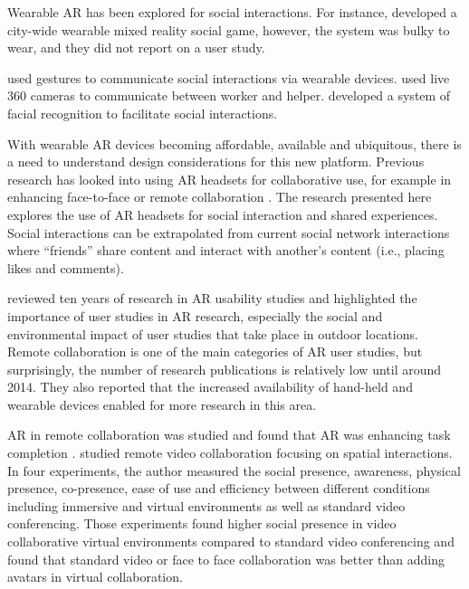 Wearable AR has been explored for social interactions. For instance, \textcite{Cheok2002a} developed a city-wide wearable mixed reality social game, however, the system was bulky to wear, and they did not report on a user study. 

\textcite{Amores2015} used gestures to communicate social interactions via wearable devices. \textcite{Lee2019} used live 360 cameras to communicate between worker and helper. \textcite{Shu2018} developed a system of facial recognition to facilitate social interactions. 

With wearable AR devices becoming affordable, available and ubiquitous, there is a need to understand design considerations for this new platform. Previous research has looked into using AR headsets for collaborative use, for example in enhancing face-to-face \cite{Billinghurst2002} or remote collaboration \cite{Gupta2016}. The research presented here explores the use of AR headsets for social interaction and shared experiences. Social interactions can be extrapolated from current social network interactions where \enquote{friends} share content and interact with another's content (i.e., placing likes and comments).

\textcite{Dey2018} reviewed ten years of research in AR usability studies and highlighted the importance of user studies in AR research, especially the social and environmental impact of user studies that take place in outdoor locations. Remote collaboration is one of the main categories of AR user studies, but surprisingly, the number of research publications is relatively low until around 2014. They also reported that the increased availability of hand-held and wearable devices enabled for more research in this area. 

AR in remote collaboration was studied and found that AR was enhancing task completion \cite{Kim2014, Tversky2015, Gupta2016, Kim2015}.
\textcite{hauber2008understanding} studied remote video collaboration focusing on spatial interactions. In four experiments, the author measured the social presence, awareness, physical presence, co-presence, ease of use and efficiency between different conditions including immersive and virtual environments as well as standard video conferencing. Those experiments found higher social presence in video collaborative virtual environments compared to standard video conferencing and found that standard video or face to face collaboration was better than adding avatars in virtual collaboration.


